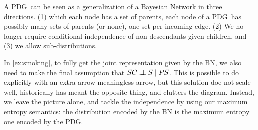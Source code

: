 \documentclass{article}
\newcommand{\MN}{PDG}
\begin{document}
	A \MN\ can be seen as a generalization of a Bayesian Network in three directions. (1) which each node has a set of parents, each node of a \MN\ has possibly many sets of parents (or none), one set per incoming edge. (2) We no longer require conditional independence of non-descendants given children, and (3) we allow sub-distributions.
	
%		
	
	
	
	
	


	
	In \cref{ex:smoking}, to fully get the joint representation given by the BN, we also need to make the final assumption that $SC \mathrel{\perp\mspace{-10mu}\perp} S \mid PS$. This is possible to do explicitly with an extra arrow meaningless arrow, but this solution doe not scale well, historically has meant the opposite thing, and clutters the diagram. Instead, we leave the picture alone, and tackle the independence by using our maximum entropy semantics: the distribution encoded by the BN is the maximum entropy one encoded by the \MN.
\end{document}
